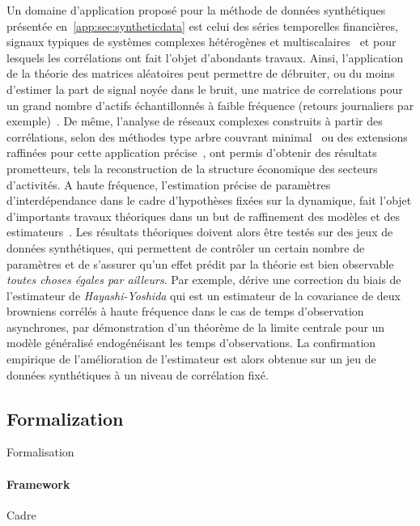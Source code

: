 {Un domaine d'application proposé pour la méthode de données synthétiques présentée en~\ref{app:sec:syntheticdata} est celui des séries temporelles financières, signaux typiques de systèmes complexes hétérogènes et multiscalaires~\cite{mantegna2000introduction} et pour lesquels les corrélations ont fait l'objet d'abondants travaux. Ainsi, l'application de la théorie des matrices aléatoires peut permettre de débruiter, ou du moins d'estimer la part de signal noyée dans le bruit, une matrice de correlations pour un grand nombre d'actifs échantillonnés à faible fréquence (retours journaliers par exemple)~\cite{2009arXiv0910.1205B}. De même, l'analyse de réseaux complexes construits à partir des corrélations, selon des méthodes type arbre couvrant minimal~\cite{2001PhyA..299...16B} ou des extensions raffinées pour cette application précise~\cite{tumminello2005tool}, ont permis d'obtenir des résultats prometteurs, tels la reconstruction de la structure économique des secteurs d'activités. A haute fréquence, l'estimation précise de paramètres d'interdépendance dans le cadre d'hypothèses fixées sur la dynamique, fait l'objet d'importants travaux théoriques dans un but de raffinement des modèles et des estimateurs~\cite{barndorff2011multivariate}. Les résultats théoriques doivent alors être testés sur des jeux de données synthétiques, qui permettent de contrôler un certain nombre de paramètres et de s'assurer qu'un effet prédit par la théorie est bien observable \emph{toutes choses égales par ailleurs}. Par exemple, \cite{potiron2015estimation} dérive une correction du biais de l'estimateur de \emph{Hayashi-Yoshida} qui est un estimateur de la covariance de deux browniens corrélés à haute fréquence dans le cas de temps d'observation asynchrones, par démonstration d'un théorème de la limite centrale pour un modèle généralisé endogénéisant les temps d'observations. La confirmation empirique de l'amélioration de l'estimateur est alors obtenue sur un jeu de données synthétiques à un niveau de corrélation fixé.
}


\subsection*{Formalization}{Formalisation}

\paragraph{Framework}{Cadre}


